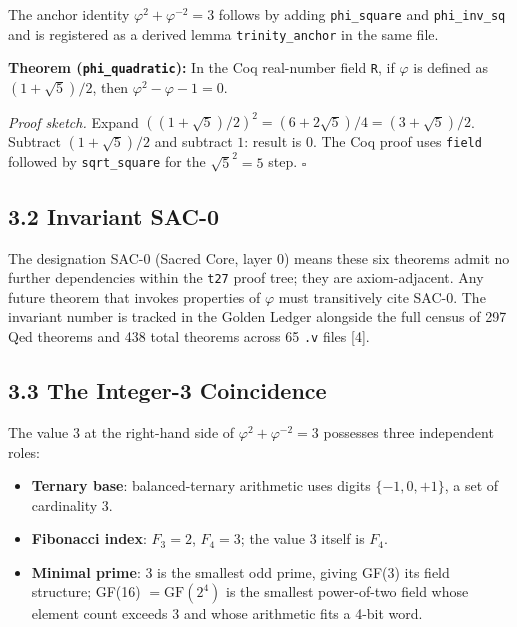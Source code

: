 The anchor identity
\(\varphi^2 + \varphi^{-2} = 3\) follows by adding
\texttt{phi\_square} and \texttt{phi\_inv\_sq} and
is registered as a derived lemma
\texttt{trinity\_anchor} in the same file.

\textbf{Theorem (\texttt{phi\_quadratic}):} In the
Coq real-number field \texttt{R}, if \(\varphi\)
is defined as \((1 + \sqrt{5})/2\), then
\(\varphi^2 - \varphi - 1 = 0\).

\emph{Proof sketch.} Expand
\(((1+\sqrt{5})/2)^2 = (6 + 2\sqrt{5})/4 = (3 + \sqrt{5})/2\).
Subtract \((1+\sqrt{5})/2\) and subtract \(1\):
result is \(0\). The Coq proof uses \texttt{field}
followed by \texttt{sqrt\_square} for the
\(\sqrt{5}^2 = 5\) step. \(\square\)

\subsection{3.2 Invariant
SAC-0}\label{fa_03:invariant-sac-0}

The designation SAC-0 (Sacred Core, layer 0) means
these six theorems admit no further dependencies
within the \texttt{t27} proof tree; they are
axiom-adjacent. Any future theorem that invokes
properties of \(\varphi\) must transitively cite
SAC-0. The invariant number is tracked in the
Golden Ledger alongside the full census of 297 Qed
theorems and 438 total theorems across 65
\texttt{.v} files [4].

\subsection{3.3 The Integer-3
Coincidence}\label{fa_03:the-integer-3-coincidence}

The value \(3\) at the right-hand side of
\(\varphi^2 + \varphi^{-2} = 3\) possesses three
independent roles:

\begin{itemize}
\tightlist
\item
  \textbf{Ternary base}: balanced-ternary
  arithmetic uses digits \(\{-1, 0, +1\}\), a set
  of cardinality \(3\).
\item
  \textbf{Fibonacci index}: \(F_3 = 2\),
  \(F_4 = 3\); the value \(3\) itself is \(F_4\).
\item
  \textbf{Minimal prime}: \(3\) is the smallest
  odd prime, giving GF(3) its field structure;
  GF(16) \(= \text{GF}(2^4)\) is the smallest
  power-of-two field whose element count exceeds
  \(3\) and whose arithmetic fits a 4-bit word.
\end{itemize}

